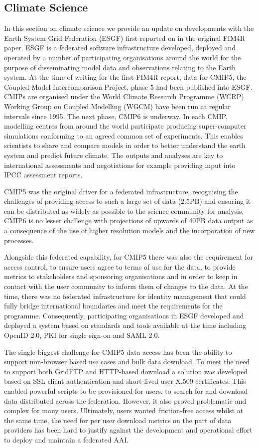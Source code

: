 \documentclass[fleqn,10pt]{wlscirep}
\begin{document}
{\subsection{Climate Science}
In this section on climate science we provide an update on developments with the Earth System Grid Federation (ESGF)\cite{esgf} first reported on in the original FIM4R paper. ESGF is a federated software infrastructure developed, deployed and operated by a number of participating organisations around the world for the purpose of disseminating model data and observations relating to the Earth system. At the time of writing for the first FIM4R report, data for CMIP5, the Coupled Model Intercomparison Project, phase 5 had been published into ESGF. CMIPs are organised under the World Climate Research Programme (WCRP) Working Group on Coupled Modelling (WGCM) have been run at regular intervals since 1995. The next phase, CMIP6 is underway. In each CMIP, modelling centres from around the world participate producing super-computer simulations conforming to an agreed common set of experiments. This enables scientists to share and compare models in order to better understand the earth system and predict future climate. The outputs and analyses are key to international assessments and negotiations for example providing input into IPCC assessment reports.

CMIP5 was the original driver for a federated infrastructure, recognising the challenges of providing access to such a large set of data (2.5PB) and ensuring it can be distributed as widely as possible to the science community for analysis. CMIP6 is no lesser challenge with projections of upwards of 40PB data output as a consequence of the use of higher resolution models and the incorporation of new processes.

Alongside this federated capability, for CMIP5 there was also the requirement for access control, to ensure users agree to terms of use for the data, to provide metrics to stakeholders and sponsoring organisations and in order to keep in contact with the user community to inform them of changes to the data. At the time, there was no federated infrastructure for identity management that could fully bridge international boundaries and meet the requirements for the programme. Consequently, participating organisations in ESGF developed and deployed a system based on standards and tools available at the time including OpenID 2.0, PKI for single sign-on and SAML 2.0.

The single biggest challenge for CMIP5 data access has been the ability to support non-browser based use cases and bulk data download. To meet the need to support both GridFTP and HTTP-based download a solution was developed based on SSL client authentication and short-lived user X.509 certificates. This enabled powerful scripts to be provisioned for users, to search for and download data distributed across the federation. However, it also proved problematic and complex for many users. Ultimately, users wanted friction-free access whilst at the same time, the need for per user download metrics on the part of data providers has been hard to justify against the development and operational effort to deploy and maintain a federated AAI.

}
\end{document}

